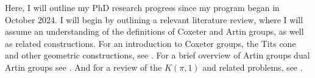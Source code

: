Here, I will outline my PhD research progress since my program began in October 2024.
I will begin by outlining a relevant literature review, where I will assume an understanding of the definitions of Coxeter and Artin groups, as well as related constructions.
For an introduction to Coxeter groups, the Tits cone and other geometric constructions, see \cite{humphreys_reflection_1990}.
For a brief overview of Artin groups dual Artin groups see \cite[Sections 1,2]{paolini_salvetti_kpi1_2021}.
And for a review of the $K(\pi,1)$ and related problems, see \cite{paris_kpi1_2014}.

